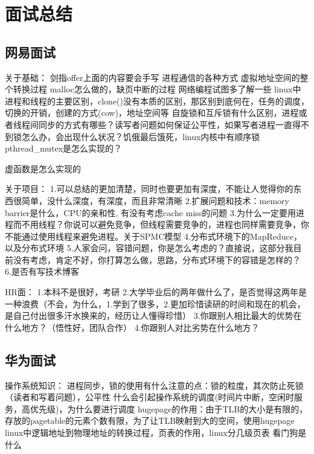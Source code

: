 \section{面试总结}

\subsection{网易面试}
关于基础：
剑指offer上面的内容要会手写
进程通信的各种方式
虚拟地址空间的整个转换过程
malloc怎么做的，缺页中断的过程
网络编程试图多了解一些
linux中进程和线程的主要区别，clone()没有本质的区别，那区别到底何在，任务的调度，切换的开销，创建的方式(cow)，地址空间等
自旋锁和互斥锁有什么区别，进程或者线程间同步的方式有哪些？读写者问题如何保证公平性，如果写者进程一直得不到锁怎么办，会出现什么状况？饥俄最后饿死，linux内核中有顺序锁
pthread\_mutex是怎么实现的？

虚函数是怎么实现的

关于项目：
1.可以总结的更加清楚，同时也要更加有深度，不能让人觉得你的东西很简单，没什么深度，有深度，而且非常清晰
2.扩展问题和技术：memory barrier是什么，CPU的亲和性, 有没有考虑cache miss的问题
3.为什么一定要用进程而不用线程？你说可以避免竞争，但线程需要竞争的，进程也同样需要竞争，你不能通过使用线程来避免进程。关于SPMC模型
4.分布式环境下的MapReduce，以及分布式环境
5.人家会问，容错问题，你是怎么考虑的？直接说，这部分我目前没有考虑，肯定不好，你打算怎么做，思路，分布式环境下的容错是怎样的？
6.是否有写技术博客

HR面：
1.本科不是很好，考研
2.大学毕业后的两年做什么了，是否觉得这两年是一种浪费（不会，为什么，1.学到了很多，2.更加珍惜读研的时间和现在的机会，是自己付出很多汗水换来的，经历让人懂得珍惜）
3.你跟别人相比最大的优势在什么地方？（悟性好，团队合作）
4.你跟别人对比劣势在什么地方？

\subsection{华为面试}
操作系统知识：
进程同步，锁的使用有什么注意的点：锁的粒度，其次防止死锁（读者和写着问题），公平性
什么会引起操作系统的调度(时间片中断，空闲时服务，高优先级)，为什么要进行调度
hugepage的作用：由于TLB的大小是有限的，存放的pagetable的元素个数有限，为了让TLB映射到大的空间，使用hugepage
linux中逻辑地址到物理地址的转换过程，页表的作用，linux分几级页表
看门狗是什么
